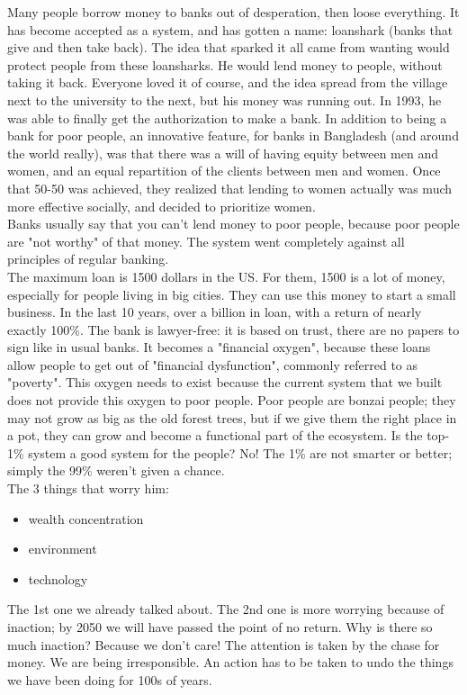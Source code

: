 \documentclass{article}
\begin{document}
 Many people borrow money to banks out of desperation, then loose everything. It has become accepted as a system, and has gotten a name: loanshark (banks that give and then take back). The idea that sparked it all came from wanting would protect people from these loansharks. He would lend money to people, without taking it back. Everyone loved it of course, and the idea spread from the village next to the university to the next, but his money was running out. In 1993, he was able to finally get the authorization to make a bank. In addition to being a bank for poor people, an innovative feature, for banks in Bangladesh (and around the world really), was that there was a will of having equity between men and women, and an equal repartition of the clients between men and women. Once that 50-50 was achieved, they realized that lending to women actually was much more effective socially, and decided to prioritize women. \\
 Banks usually say that you can't lend money to poor people, because poor people are "not worthy" of that money. The system went completely against all principles of regular banking. \\
The maximum loan is 1500 dollars in the US. For them, 1500 is a lot of money, especially for people living in big cities. They can use this money to start a small business. In the last 10 years, over a billion in loan, with a return of nearly exactly 100\%. The bank is lawyer-free: it is based on trust, there are no papers to sign like in usual banks. It becomes a "financial oxygen", because these loans allow people to get out of "financial dysfunction", commonly referred to as "poverty". This oxygen needs to exist because the current system that we built does not provide this oxygen to poor people. Poor people are bonzai people; they may not grow as big as the old forest trees, but if we give them the right place in a pot, they can grow and become a functional part of the ecosystem. Is the top-1\% system a good system for the people? No! The 1\% are not smarter or better; simply the 99\% weren't given a chance. \\

The 3 things that worry him:
\begin{itemize}
	\item wealth concentration
	\item environment
	\item technology
\end{itemize}

The 1st one we already talked about. The 2nd one is more worrying because of inaction; by 2050 we will have passed the point of no return. Why is there so much inaction? Because we don't care! The attention is taken by the chase for money. We are being irresponsible. An action has to be taken to undo the things we have been doing for 100s of years. \\
\end{document}
